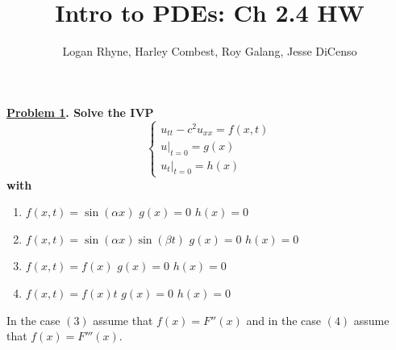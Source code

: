 \documentclass{article}
\title{Intro to PDEs: Ch 2.4 HW}
\author{Logan Rhyne, Harley Combest, Roy Galang, Jesse DiCenso}
\theoremstyle{definition}
\newenvironment{boldenv}{\bfseries\boldmath}{}
\begin{document}
	
	\maketitle
	
	\begin{boldenv}
		\underline{Problem 1}. Solve the IVP
            \[
            \begin{cases}
                u_{tt} - c^2u_{xx} = f(x,t)\\
                u|_{t=0} = g(x)\\
                u_t|_{t=0} = h(x)
            \end{cases}
            \]
            with
            \begin{enumerate}[(1), start=2, series=problems]
		    \item $f(x,t) = \sin(\alpha x)$ \hphantom{$\sin(\beta t)$}\hspace*{\fill} $g(x) = 0$ \hspace*{\fill} $h(x) = 0$
		\item $f(x,t) = \sin(\alpha x)\sin(\beta t)$  \hspace*{\fill} \negmedspace$g(x) = 0$ \hspace*{\fill} $h(x) = 0$
            \item $f(x,t) = f(x)$\hphantom{xx$\sin(\beta t)$} \hspace*{\fill} $g(x) = 0$ \hspace*{\fill} $h(x) = 0$
            \item $f(x,t) = f(x)t$\hphantom{x $\sin(\beta t)$} \hspace*{\fill} $g(x) = 0$ \hspace*{\fill} $h(x) = 0$
		\end{enumerate}
            In the case $(3)$ assume that $f(x) = F''(x)$ and in the case $(4)$ assume that
            $f(x) = F'''(x)$.
            \end{boldenv}
		
\end{document}
